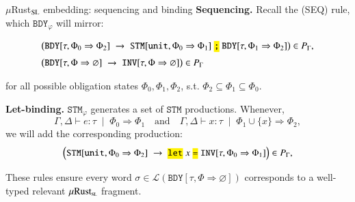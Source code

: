 \documentclass{beamer}
\newcommand{\codett}[1]{\texttt{\hl{#1}}}
\newcommand{\nt}[1]{\texttt{#1}}      %
\newcommand{\tok}[1]{\codett{#1}}     %
\newcommand{\uses}[2]{\;\mid\; #1 \Rightarrow #2}
\begin{document}
\begin{frame}{$\mu$Rust$_{\textsc{SL}}$ embedding: sequencing and binding}
  \textbf{Sequencing.} Recall the (SEQ) rule, which $\nt{BDY}_\varphi$ will mirror:\vspace{-0.3cm}

  \[
    \begin{array}{ll}
      \big(\nt{BDY}[\tau,\Phi_0 \Rightarrow \Phi_2] \;\rightarrow\; \nt{STM}[\mathtt{unit},\Phi_0 \Rightarrow \Phi_1]\;\tok{;}\;\nt{BDY}[\tau,\Phi_1 \Rightarrow \Phi_2]\big)\in P_\Gamma,\\[0.2cm]
      \big(\nt{BDY}[\tau,\Phi \Rightarrow \varnothing] \;\rightarrow\; \nt{INV}[\tau,\Phi \Rightarrow \varnothing]\big)\in P_\Gamma
    \end{array}
  \]

  for all possible obligation states $\Phi_0,\Phi_1,\Phi_2$, s.t. $\Phi_2 \subseteq \Phi_1 \subseteq \Phi_0$.

  \medskip
  \textbf{Let-binding.} $\nt{STM}_\varphi$ generates a set of $\nt{STM}$ productions. Whenever,
  \[
    \Gamma,\Delta \vdash e:\tau \uses{\Phi_0}{\Phi_1}
    \quad\text{and}\quad
    \Gamma,\Delta \vdash x:\tau \uses{\Phi_1\cup\{x\}}{\Phi_2},
  \]
  we will add the corresponding production:
  \[
    \Big(
    \nt{STM}[\mathtt{unit},\Phi_0 \Rightarrow \Phi_2] \;\rightarrow\;
    \tok{let}\;x\;\tok{=}\;
    \nt{INV}[\tau,\Phi_0 \Rightarrow \Phi_1]
    \Big)\in P_\Gamma,
  \]

  These rules ensure every word $\sigma \in \mathcal{L}(\nt{BDY}[\tau,\Phi \Rightarrow \varnothing])$ corresponds to a well-typed relevant $\mu\text{Rust}_{\textsc{sl}}$ fragment.
\end{frame}
\end{document}
